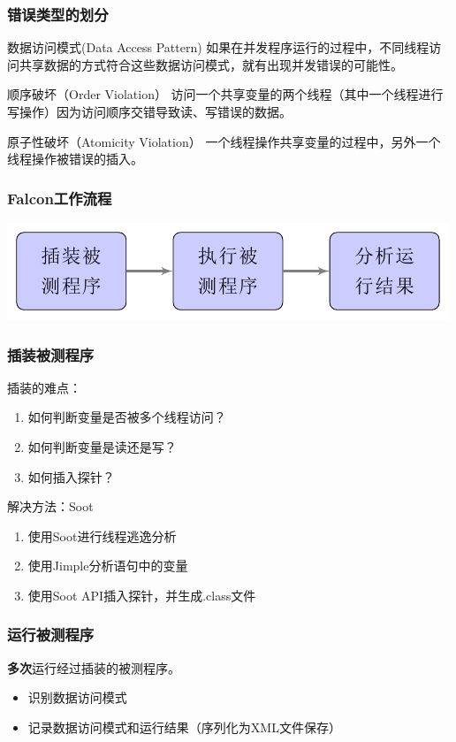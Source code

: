 ﻿\documentclass[12pt,serif,hyperref={CJKbookmarks=true}]{beamer}
\begin{document}
  \begin{frame}
    \frametitle{错误类型的划分}
    \begin{block}{数据访问模式(Data Access Pattern)}
      如果在并发程序运行的过程中，不同线程访问共享数据的方式符合这些数据访问模式，就有出现并发错误的可能性。
    \end{block}
    \pause
    \begin{exampleblock}{顺序破坏（Order Violation）}
      访问一个共享变量的两个线程（其中一个线程进行写操作）因为访问顺序交错导致读、写错误的数据。
    \end{exampleblock}
    \begin{exampleblock}{原子性破坏（Atomicity Violation）}
      一个线程操作共享变量的过程中，另外一个线程操作被错误的插入。
    \end{exampleblock}
  \end{frame}

  \begin{frame}
    \frametitle{Falcon工作流程}
    \centering
    \includegraphics[width=\textwidth]{FlowDiagram.pdf}
  \end{frame}

  \begin{frame}
    \frametitle{插装被测程序}
    插装的难点：
    \begin{enumerate}
      \item 如何判断变量是否被多个线程访问？
      \item 如何判断变量是读还是写？
      \item 如何插入探针？
    \end{enumerate}
    \pause
    解决方法：Soot
    \begin{enumerate}
      \item 使用Soot进行线程逃逸分析
      \item 使用Jimple分析语句中的变量
      \item 使用Soot API插入探针，并生成.class文件
    \end{enumerate}
  \end{frame}

  \begin{frame}
    \frametitle{运行被测程序}
    \textbf{多次}运行经过插装的被测程序。
    \pause
    \begin{itemize}
      \item 识别数据访问模式
      \item 记录数据访问模式和运行结果（序列化为XML文件保存）
    \end{itemize}
  \end{frame}
\end{document}
